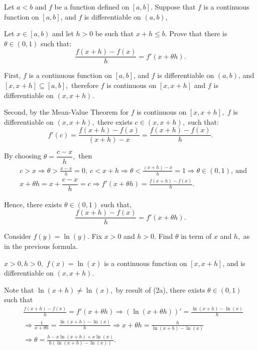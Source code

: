 \documentclass{article}
\begin{document}
\newpage

\begin{problem*}[2a]
    Let $a<b$ and $f$ be a function defined on $[a,b].$ Suppose that $f$ is a continuous function on $[a,b]$, and $f$ is differentiable on $(a,b)$, 

    Let $x \in \left[ a, b \right)$ and let $h > 0$ be such that $x+h \le b.$ Prove that there is $\theta \in (0,1)$ such that:
    \[
        \frac{f(x+h) - f(x)}{h} = f'(x+\theta h).
    \]
\end{problem*}

\begin{soln}
    First, $f$ is a continuous function on $[a,b]$, and $f$ is differentiable on $(a,b)$, and $[x, x+h] \subseteq [a,b],$
    therefore $f$ is continuous on $[x, x+h]$ and $f$ is differentiable on $(x, x+h).$ 

    Second, by the Mean-Value Theorem for $f$ is continuous on $[x, x+h],$ $f$ is differentiable on $(x, x+h),$ there exists $c \in (x, x+h),$ such that:
    \[
        f'(c) = \frac{f(x+h)-f(x)}{(x+h) - x} = \frac{f(x+h) - f(x)}{h}.
    \]

    By choosing $\theta = \dfrac{c-x}{h},$ then
    \[
        \begin{aligned}
            &c > x \Rightarrow \theta > \frac{x-x}{h} = 0,\ c < x+h \Rightarrow \theta < \frac{(x+h)-x}{h} = 1 \Rightarrow \theta \in (0, 1),\ \text{and}\\
            &x + \theta h = x + \dfrac{c-x}{h}  = c \Rightarrow f'(x+ \theta h) = \frac{f(x+h) - f(x)}{h}.
        \end{aligned}
    \]

    Hence, there exists $\theta \in (0,1)$ such that, 
    \[
        \frac{f(x+h) - f(x)}{h} = f'(x + \theta h).
    \]
\end{soln}

\bigbreak

\begin{problem*}[2b]
    Consider $f(y) = \ln(y).$ Fix $x >0$ and $h>0.$ Find $\theta$ in term of $x$ and $h,$ as in the previous formula.
\end{problem*}

\begin{soln}
    $x > 0, h > 0,$ $f(x)=\ln(x)$ is a continuous function on $[x,x+h]$, and is differentiable on $(x, x+h).$

    Note that $\ln(x+h) \ne \ln(x),$ by result of (2a), there exists $\theta \in (0,1)$  such that
    \[
        \begin{aligned}
            &\frac{f(x+h) - f(x)}{h} = f'(x + \theta h) \Rightarrow (\ln(x + \theta h))' = \frac{\ln(x+h) - \ln(x)}{h}\\
            &\Rightarrow \frac{1}{x + \theta h} = \frac{\ln(x+h) - \ln(x)}{h} \Rightarrow x + \theta h = \frac{h}{\ln(x+h) - \ln(x)}\\
            &\Rightarrow \theta = \boxed{\frac{h - x \ln(x+h) + x \ln(x)}{h(\ln(x+h) - \ln(x))}.}
        \end{aligned}
    \]
\end{soln}
\end{document}
